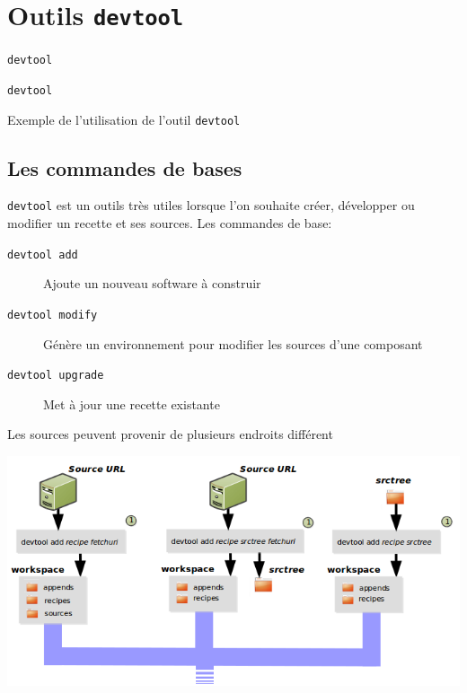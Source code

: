 \documentclass[compress]{smilebeamer}
\begin{document}
\section{Outils \texttt{devtool}}

\begin{frame}{\texttt{devtool}}
\end{frame}

\begin{frame}{\texttt{devtool}}
\begin{center}
\textcolor{smileOrange}{\huge{Exemple de l'utilisation de l'outil \texttt{devtool}}}
\end{center}
\end{frame}

\subsection{Les commandes de bases}

\begin{frame}
\texttt{devtool} est un outils très utiles lorsque l'on souhaite créer, développer ou modifier un recette et ses sources.\newline
Les commandes de base:
\begin{description}
	\item[\texttt{devtool add}] Ajoute un nouveau software à construir
	\item[\texttt{devtool modify}] Génère un environnement pour modifier les sources d'une composant
	\item[\texttt{devtool upgrade}] Met à jour une recette existante
\end{description}
\end{frame}

\begin{frame}
Les sources peuvent provenir de plusieurs endroits différent
\begin{center}
	\includegraphics[width=1\textwidth]{images/devtool-add-src.png}
\end{center}
\end{frame}
\end{document}
